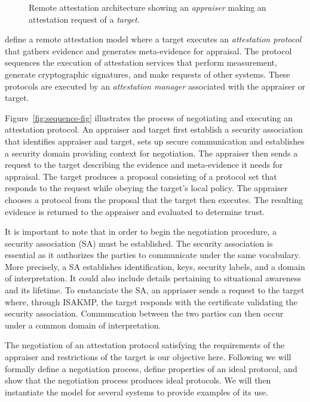 \documentclass[sigconf,authordraft]{acmart}
\begin{document}
\begin{figure}[hbtp]
  \centering
  
  \caption[Attestation architecture]{Remote attestation architecture
    showing an \emph{appraiser} making an attestation request of a
    \emph{target}.}
  \label{fig:architecture-fig}
\end{figure}

\citet{Coker::Principles-of-R,Coker:08:Attestation:-Ev} define a
remote attestation model where a target executes an \emph{attestation
  protocol} that gathers evidence and generates meta-evidence for
appraisal.  The protocol sequences the execution of attestation
services that perform measurement, generate cryptographic signatures,
and make requests of other systems. These protocols are executed by an
\emph{attestation manager} associated with the appraiser or target.

Figure~\ref{fig:sequence-fig} illustrates the process of negotiating
and executing an attestation protocol.  An appraiser and target first
establish a security association that identifies appraiser and target,
sets up secure communication and establishes a security domain
providing context for negotiation.  The appraiser then sends a
request to the target describing the evidence and meta-evidence it
needs for appraisal.  The target produces a proposal consisting of a
protocol set that responds to the request while obeying the target's
local policy.  The appraiser chooses a protocol from the proposal that
the target then executes.  The resulting evidence is returned to the
appraiser and evaluated to determine trust.


It is important to note that in order to begin the negotiation procedure,
a security association (SA) must be established. The security association is essential as it authorizes the parties to communicate under the same vocabulary. More precisely, a SA  establishes identification, keys, security labels, and  a domain of interpretation. It could also include details pertaining to situational awareness and its lifetime. To enstanciate the SA, an appriaser sends a request to the target where, through ISAKMP, the target responds with the certificate validating the security association. Communcation between the two parties can then occur under a common domain of interpretation.   

The negotiation of an attestation protocol satisfying the
requirements of the appraiser and restrictions of the target is our
objective here.  Following we will formally define a negotiation
process, define properties of an ideal protocol, and show that the
negotiation process produces ideal protocols.  We will then
instantiate the model for several systems to provide examples of its use.
\end{document}
